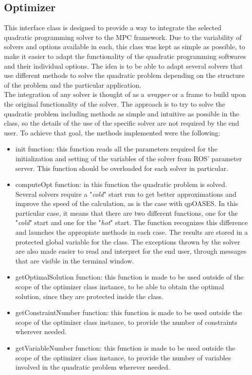 \subsection{Optimizer}

This interface class is designed to provide a way to integrate the selected quadratic programming solver to the MPC framework. Due to the variability of solvers and options available in each, this class was kept as simple as possible, to make it easier to adapt the functionality of the quadratic programming softwares and their individual options. The idea is to be able to adapt several solvers that use different methods to solve the quadratic problem depending on the structure of the problem and the particular application. \\

The integration of any solver is thought of as a \emph{wrapper} or a frame to build upon the original functionality of the solver. The approach is to try to solve the quadratic problem including methods as simple and intuitive as possible in the class, so the details of the use of the specific solver are not required by the end user. To achieve that goal, the methods implemented were the following:

\begin{itemize}

\item init function: this function reads all the parameters required for the initialization and setting of the variables of the solver from ROS' parameter server. This function should be overloaded for each solver in particular.

\item computeOpt function: in this function the quadratic problem is solved. Several solvers require a "\emph{cold}" start run to get better approximations and improve the speed of the calculation, as is the case with qpOASES. In this particular case, it means that there are two different functions, one for the "\emph{cold}" start and one for the "\emph{hot}" start. The function recognizes this difference and launches the appropiate methods in each case. The results are stored in a protected global variable for the class. The exceptions thrown by the solver are also made easier to read and interpret for the end user, through messages that are visible in the terminal window.

\item getOptimalSolution function: this function is made to be used outside of the scope of the optimizer class instance, to be able to obtain the optimal solution, since they are protected inside the class.

\item getConstraintNumber function: this function is made to be used outside the scope of the optimizer class instance, to provide the number of constraints wherever needed.

\item getVariableNumber function: this function is made to be used outside the scope of the optimizer class instance, to provide the number of variables involved in the quadratic problem wherever needed.

\end{itemize}  

